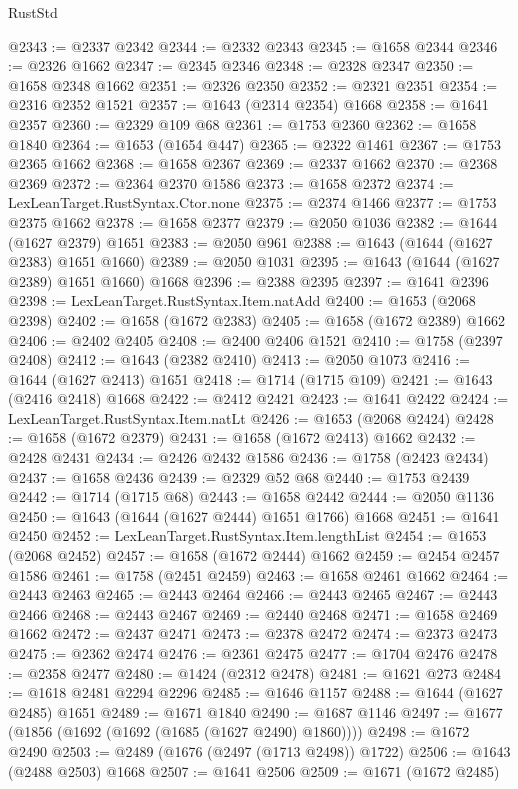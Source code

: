 \begin{lexlean}{RustStd}
\begin{coremodule}
@2343 := @2337 @2342
@2344 := @2332 @2343
@2345 := @1658 @2344
@2346 := @2326 @1662
@2347 := @2345 @2346
@2348 := @2328 @2347
@2350 := @1658 @2348 @1662
@2351 := @2326 @2350
@2352 := @2321 @2351
@2354 := @2316 @2352 @1521
@2357 := @1643 (@2314 @2354) @1668
@2358 := @1641 @2357
@2360 := @2329 @109 @68
@2361 := @1753 @2360
@2362 := @1658 @1840
@2364 := @1653 (@1654 @447)
@2365 := @2322 @1461
@2367 := @1753 @2365 @1662
@2368 := @1658 @2367
@2369 := @2337 @1662
@2370 := @2368 @2369
@2372 := @2364 @2370 @1586
@2373 := @1658 @2372
@2374 := LexLeanTarget.RustSyntax.Ctor.none
@2375 := @2374 @1466
@2377 := @1753 @2375 @1662
@2378 := @1658 @2377
@2379 := @2050 @1036
@2382 := @1644 (@1627 @2379) @1651
@2383 := @2050 @961
@2388 := @1643 (@1644 (@1627 @2383) @1651 @1660)
@2389 := @2050 @1031
@2395 := @1643 (@1644 (@1627 @2389) @1651 @1660) @1668
@2396 := @2388 @2395
@2397 := @1641 @2396
@2398 := LexLeanTarget.RustSyntax.Item.natAdd
@2400 := @1653 (@2068 @2398)
@2402 := @1658 (@1672 @2383)
@2405 := @1658 (@1672 @2389) @1662
@2406 := @2402 @2405
@2408 := @2400 @2406 @1521
@2410 := @1758 (@2397 @2408)
@2412 := @1643 (@2382 @2410)
@2413 := @2050 @1073
@2416 := @1644 (@1627 @2413) @1651
@2418 := @1714 (@1715 @109)
@2421 := @1643 (@2416 @2418) @1668
@2422 := @2412 @2421
@2423 := @1641 @2422
@2424 := LexLeanTarget.RustSyntax.Item.natLt
@2426 := @1653 (@2068 @2424)
@2428 := @1658 (@1672 @2379)
@2431 := @1658 (@1672 @2413) @1662
@2432 := @2428 @2431
@2434 := @2426 @2432 @1586
@2436 := @1758 (@2423 @2434)
@2437 := @1658 @2436
@2439 := @2329 @52 @68
@2440 := @1753 @2439
@2442 := @1714 (@1715 @68)
@2443 := @1658 @2442
@2444 := @2050 @1136
@2450 := @1643 (@1644 (@1627 @2444) @1651 @1766) @1668
@2451 := @1641 @2450
@2452 := LexLeanTarget.RustSyntax.Item.lengthList
@2454 := @1653 (@2068 @2452)
@2457 := @1658 (@1672 @2444) @1662
@2459 := @2454 @2457 @1586
@2461 := @1758 (@2451 @2459)
@2463 := @1658 @2461 @1662
@2464 := @2443 @2463
@2465 := @2443 @2464
@2466 := @2443 @2465
@2467 := @2443 @2466
@2468 := @2443 @2467
@2469 := @2440 @2468
@2471 := @1658 @2469 @1662
@2472 := @2437 @2471
@2473 := @2378 @2472
@2474 := @2373 @2473
@2475 := @2362 @2474
@2476 := @2361 @2475
@2477 := @1704 @2476
@2478 := @2358 @2477
@2480 := @1424 (@2312 @2478)
@2481 := @1621 @273
@2484 := @1618 @2481 @2294 @2296
@2485 := @1646 @1157
@2488 := @1644 (@1627 @2485) @1651
@2489 := @1671 @1840
@2490 := @1687 @1146
@2497 := @1677 (@1856 (@1692 (@1692 (@1685 (@1627 @2490) @1860))))
@2498 := @1672 @2490
@2503 := @2489 (@1676 (@2497 (@1713 @2498)) @1722)
@2506 := @1643 (@2488 @2503) @1668
@2507 := @1641 @2506
@2509 := @1671 (@1672 @2485)

\end{coremodule}
\end{lexlean}
